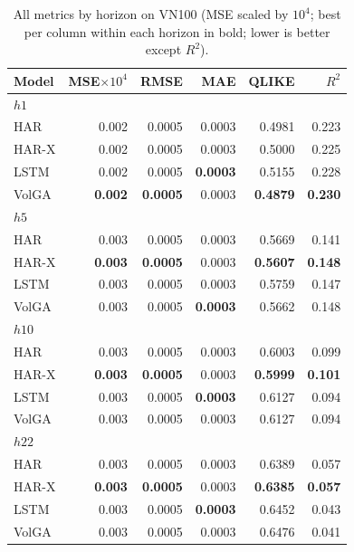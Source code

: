 \begin{table}[t]
\centering
\caption{All metrics by horizon on VN100 (MSE scaled by $10^{4}$; best per column within each horizon in bold; lower is better except $R^2$).}
\label{tab:full_vn100}
\begin{tabular}{lrrrrr}
\toprule
Model & MSE$\times10^{4}$ & RMSE & MAE & QLIKE & $R^2$ \\
\midrule
\multicolumn{6}{l}{\textit{$h1$}} \\
HAR & 0.002 & 0.0005 & 0.0003 & 0.4981 & 0.223 \\
HAR-X & 0.002 & 0.0005 & 0.0003 & 0.5000 & 0.225 \\
LSTM & 0.002 & 0.0005 & \textbf{0.0003} & 0.5155 & 0.228 \\
VolGA & \textbf{0.002} & \textbf{0.0005} & 0.0003 & \textbf{0.4879} & \textbf{0.230} \\
\midrule
\multicolumn{6}{l}{\textit{$h5$}} \\
HAR & 0.003 & 0.0005 & 0.0003 & 0.5669 & 0.141 \\
HAR-X & \textbf{0.003} & \textbf{0.0005} & 0.0003 & \textbf{0.5607} & \textbf{0.148} \\
LSTM & 0.003 & 0.0005 & 0.0003 & 0.5759 & 0.147 \\
VolGA & 0.003 & 0.0005 & \textbf{0.0003} & 0.5662 & 0.148 \\
\midrule
\multicolumn{6}{l}{\textit{$h10$}} \\
HAR & 0.003 & 0.0005 & 0.0003 & 0.6003 & 0.099 \\
HAR-X & \textbf{0.003} & \textbf{0.0005} & 0.0003 & \textbf{0.5999} & \textbf{0.101} \\
LSTM & 0.003 & 0.0005 & \textbf{0.0003} & 0.6127 & 0.094 \\
VolGA & 0.003 & 0.0005 & 0.0003 & 0.6127 & 0.094 \\
\midrule
\multicolumn{6}{l}{\textit{$h22$}} \\
HAR & 0.003 & 0.0005 & 0.0003 & 0.6389 & 0.057 \\
HAR-X & \textbf{0.003} & \textbf{0.0005} & 0.0003 & \textbf{0.6385} & \textbf{0.057} \\
LSTM & 0.003 & 0.0005 & \textbf{0.0003} & 0.6452 & 0.043 \\
VolGA & 0.003 & 0.0005 & 0.0003 & 0.6476 & 0.041 \\
\bottomrule
\end{tabular}
\end{table}
